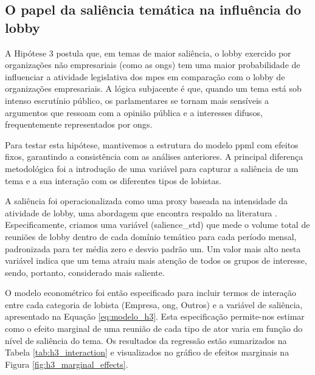 \subsection{O papel da saliência temática na influência do lobby}

A Hipótese 3 postula que, em temas de maior saliência, o lobby exercido por organizações não empresariais (como as \acrshort{ong}s) tem uma maior probabilidade de influenciar a atividade legislativa dos \acrshort{mpe}s em comparação com o lobby de organizações empresariais. A lógica subjacente é que, quando um tema está sob intenso escrutínio público, os parlamentares se tornam mais sensíveis a argumentos que ressoam com a opinião pública e a interesses difusos, frequentemente representados por \acrshort{ong}s.

Para testar esta hipótese, mantivemos a estrutura do modelo \acrshort{ppml} com efeitos fixos, garantindo a consistência com as análises anteriores. A principal diferença metodológica foi a introdução de uma variável para capturar a saliência de um tema e a sua interação com os diferentes tipos de lobistas.

A saliência foi operacionalizada como uma proxy baseada na intensidade da atividade de lobby, uma abordagem que encontra respaldo na literatura \cite{baumgartner2010agendas}. Especificamente, criamos uma variável (salience\_std) que mede o volume total de reuniões de lobby dentro de cada domínio temático para cada período mensal, padronizada para ter média zero e desvio padrão um. Um valor mais alto nesta variável indica que um tema atraiu mais atenção de todos os grupos de interesse, sendo, portanto, considerado mais saliente.

O modelo econométrico foi então especificado para incluir termos de interação entre cada categoria de lobista (Empresa, \acrshort{ong}, Outros) e a variável de saliência, apresentado na Equação \ref{eq:modelo_h3}. Esta especificação permite-nos estimar como o efeito marginal de uma reunião de cada tipo de ator varia em função do nível de saliência do tema. Os resultados da regressão estão sumarizados na Tabela \ref{tab:h3_interaction} e visualizados no gráfico de efeitos marginais na Figura \ref{fig:h3_marginal_effects}.





